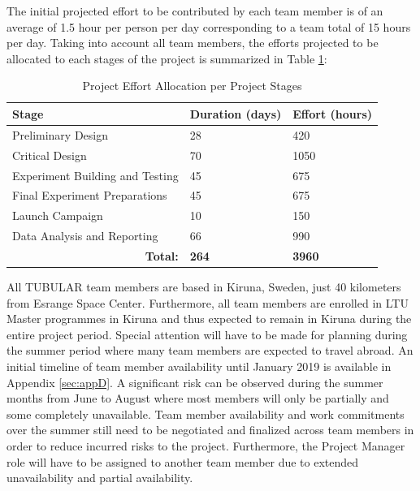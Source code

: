 \documentclass[a4paper,12pt,twoside]{article}
\begin{document}
The initial projected effort to be contributed by each team member is of an average of 1.5 hour per person per day corresponding to a team total of 15 hours per day. Taking into account all team members, the efforts projected to be allocated to each stages of the project is summarized in Table \ref{tab:effort-allocation-stages}:

\begin{table}[H]
\centering
\begin{tabular}{l|l|l|}
\hline
\multicolumn{1}{|l|}{\textbf{Stage}} & \textbf{Duration (days)} & \textbf{Effort (hours)} \\ \hline
\multicolumn{1}{|l|}{Preliminary Design} & 28 & 420 \\ \hline
\multicolumn{1}{|l|}{Critical Design} & 70 & 1050 \\ \hline
\multicolumn{1}{|l|}{Experiment Building and Testing} & 45 & 675 \\ \hline
\multicolumn{1}{|l|}{Final Experiment Preparations} & 45 & 675 \\ \hline
\multicolumn{1}{|l|}{Launch Campaign} & 10 & 150 \\ \hline
\multicolumn{1}{|l|}{Data Analysis and Reporting} & 66 & 990 \\ \hline
\multicolumn{1}{r|}{\textbf{Total:}} & \textbf{264} & \textbf{3960} \\ \cline{2-3} 
\end{tabular}
\caption{Project Effort Allocation per Project Stages}
\label{tab:effort-allocation-stages}
\end{table}
\raggedbottom

All TUBULAR team members are based in Kiruna, Sweden, just 40 kilometers from Esrange Space Center. Furthermore, all team members are enrolled in LTU Master programmes in Kiruna and thus expected to remain in Kiruna during the entire project period. Special attention will have to be made for planning during the summer period where many team members are expected to travel abroad. An initial timeline of team member availability  until January 2019 is available in Appendix \ref{sec:appD}. A significant risk can be observed during the summer months from June to August where most members will only be partially and some completely unavailable. Team member availability and work commitments over the summer still need to be negotiated and finalized across team members in order to reduce incurred risks to the project. Furthermore, the Project Manager role will have to be assigned to another team member due to extended unavailability and partial availability.
\end{document}
